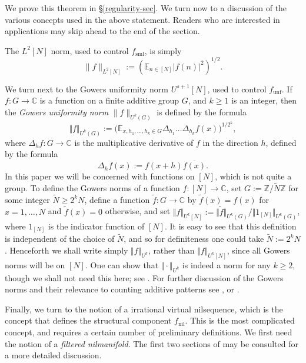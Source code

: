 \documentclass[11pt,reqno]{amsart}
\numberwithin{equation}{section}
\theoremstyle{plain}
\theoremstyle{definition}
\renewcommand{\geq}{\geqslant}
\newcommand\E{{\mathbb{E}}}
\newcommand\Z{\mathbb{Z}}
\newcommand\C{\mathbb{C}}
\newcommand\1{{\bf 1}}
\newcommand\2{{\bf 2}}
\newcommand\nil{{\operatorname{nil}}}
\newcommand\sml{{\operatorname{sml}}}
\newcommand\unf{{\operatorname{unf}}}
\begin{document}
We prove this theorem in \S  \ref{regularity-sec}.  We turn now to a discussion of the various concepts used in the above statement.  Readers who are interested in applications may skip ahead to the end of the section.

The $L^2[N]$ norm, used to control $f_\sml$, is simply
$$ \|f\|_{L^2[N]} := (\E_{n \in [N]} |f(n)|^2)^{1/2}.$$

We turn next to the Gowers uniformity norm $U^{s+1}[N]$, used to control $f_\unf$.
If $f : G \rightarrow \C$ is a function on a finite additive group $G$, and $k \geq 1$ is an integer, then the \emph{Gowers uniformity norm} $\|f\|_{U^k(G)}$ is defined by the formula
\[ \Vert f \Vert_{U^{k}(G)} := \big(  \E_{x,h_1,\dots,h_k \in G} \Delta_{h_1} \dots \Delta_{h_k}  f(x) \big)^{1/2^k},\]
where $\Delta_h f: G \to \C$ is the multiplicative derivative of $f$ in the direction $h$, defined by the formula
\[ \Delta_h f(x) := f(x+h) \overline{f(x)}.\] 
In this paper we will be concerned with functions on $[N]$, which is not quite a group. To define the Gowers norms of a function $f : [N] \rightarrow \C$, set $G := \Z/\tilde N\Z$ for some integer $\tilde N \geq 2^k N$, define a function $\tilde f : G \rightarrow \C$ by $\tilde f(x) = f(x)$ for $x = 1,\dots,N$ and $\tilde f(x) = 0$ otherwise, and set $\Vert f \Vert_{U^k[N]} := \Vert \tilde f \Vert_{U^k(G)}/\Vert 1_{[N]}\Vert_{U^k(G)}$, where $1_{[N]}$ is the indicator function of $[N]$. It is easy to see that this definition is independent of the choice of $\tilde N$, and so for definiteness one could take $\tilde N := 2^k N$. 
Henceforth we shall write simply $\Vert f \Vert_{U^k}$, rather than $\Vert f \Vert_{U^k[N]}$, since all Gowers norms will be on $[N]$. One can show that $\Vert \cdot \Vert_{U^k}$ is indeed a norm for any $k \geq 2$, though we shall not need this here; see \cite{gowers-longaps}.  For further discussion of the Gowers norms and their relevance to counting additive patterns see \cite{gowers-longaps}, \cite[\S 5]{green-tao-longprimeaps} or \cite[\S 11]{tao-vu}.


Finally, we turn to the notion of a irrational virtual nilsequence, which is the concept that defines the structural component $f_\nil$.  This is the most complicated concept, and requires a certain number of preliminary definitions.  We first need the notion of a \emph{filtered nilmanifold}. The first two sections of \cite{green-tao-nilratner} may be consulted for a more detailed discussion.
\end{document}
